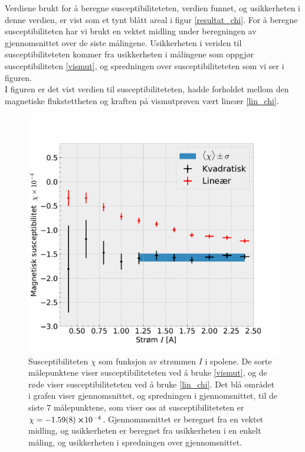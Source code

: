 \documentclass[%
 reprint,
 amsmath,amssymb,
 aps,
 norsk,
]{revtex4-1}
\begin{document}
Verdiene brukt for å beregne susceptibiliteteten, verdien funnet, og usikkerheten i denne verdien, er vist som et tynt blått areal i figur \vref{resultat_chi}. For å beregne susceptibiliteten har vi brukt en vektet midling under beregningen av gjennomsnittet over de siste målingene. Usikkerheten i veriden til susceptibiliteteten kommer fra usikkerheten i målingene som oppgjør susceptibiliteten \eqref{vismut}, og spredningen over susceptibiliteteten som vi ser i figuren.\\
I figuren er det vist verdien til susceptibiliteteten, hadde forholdet mellom den magnetiske flukstettheten og kraften på vismutprøven vært lineær \eqref{lin_chi}.
\begin{figure}[h!]
  \centering
  \includegraphics[scale=0.45]{chi_effekt.pdf}
  \caption{Susceptibiliteten $\chi$ som funksjon av strømmen $I$ i spolene. De sorte målepunktene viser susceptibiliteteten ved å bruke \eqref{vismut}, og de røde viser susceptibiliteteten ved å bruke \eqref{lin_chi}. Det blå området i grafen viser gjennomsnittet, og spredningen i gjennomsnittet, til de siste $7$ målepunktene, som viser oss at susceptibiliteteten er $\chi = -\SI{1.59\pm0.08}\cross 10^{-4}$. Gjennommsnittet er beregnet fra en vektet midling, og usikkerheten er beregnet fra usikkerheten i en enkelt måling, og usikkerheten i spredningen over gjennomsnittet.}
  \label{resultat_chi}
\end{figure}
\end{document}
